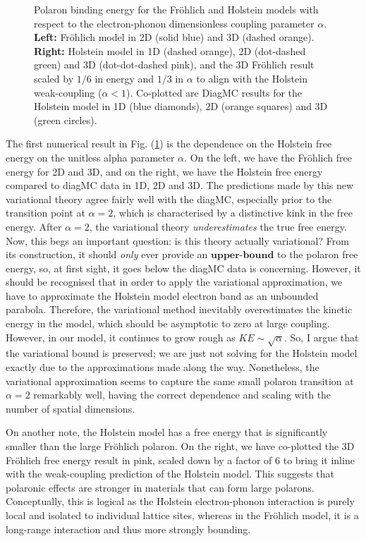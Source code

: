 \begin{figure}
\begin{subfigure}[b]{0.49\textwidth}
  \end{subfigure}
  \caption{Polaron binding energy for the Fr\"ohlich and Holstein models with respect to the electron-phonon dimensionless coupling parameter $\alpha$. \textbf{Left:} Fr\"ohlich model in 2D (solid blue) and 3D (dashed orange). \textbf{Right:} Holstein model in 1D (dashed orange), 2D (dot-dashed green) and 3D (dot-dot-dashed pink), and the 3D Fr\"ohlich result scaled by $1/6$ in energy and $1/3$ in $\alpha$ to align with the Holstein weak-coupling ($\alpha < 1$). Co-plotted are DiagMC results for the Holstein model in 1D (blue diamonds), 2D (orange squares) and 3D (green circles).}
  \label{fig:energy_alpha}
\end{figure}

The first numerical result in Fig. (\ref{fig:energy_alpha}) is the dependence on the Holstein free energy on the unitless alpha parameter $\alpha$. On the left, we have the Fr\"ohlich free energy for 2D and 3D, and on the right, we have the Holstein free energy compared to diagMC data in 1D, 2D and 3D. The predictions made by this new variational theory agree fairly well with the diagMC, especially prior to the transition point at $\alpha = 2$, which is characterised by a distinctive kink in the free energy. After $\alpha = 2$, the variational theory \emph{underestimates} the true free energy. Now, this begs an important question: is this theory actually variational? From its construction, it should \emph{only} ever provide an $\textbf{upper-bound}$ to the polaron free energy, so, at first sight, it goes below the diagMC data is concerning. However, it should be recognised that in order to apply the variational approximation, we have to approximate the Holstein model electron band as an unbounded parabola. Therefore, the variational method inevitably overestimates the kinetic energy in the model, which should be asymptotic to zero at large coupling. However, in our model, it continues to grow rough as $KE \sim \sqrt{\alpha}$. So, I argue that the variational bound is preserved; we are just not solving for the Holstein model exactly due to the approximations made along the way. Nonetheless, the variational approximation seems to capture the same small polaron transition at $\alpha = 2$ remarkably well, having the correct dependence and scaling with the number of spatial dimensions.

On another note, the Holstein model has a free energy that is significantly smaller than the large Fr\"ohlich polaron. On the right, we have co-plotted the 3D Fr\"ohlich free energy result in pink, scaled down by a factor of $6$ to bring it inline with the weak-coupling prediction of the Holstein model. This suggests that polaronic effects are stronger in materials that can form large polarons. Conceptually, this is logical as the Holstein electron-phonon interaction is purely local and isolated to individual lattice sites, whereas in the Fr\"ohlich model, it is a long-range interaction and thus more strongly bounding.

